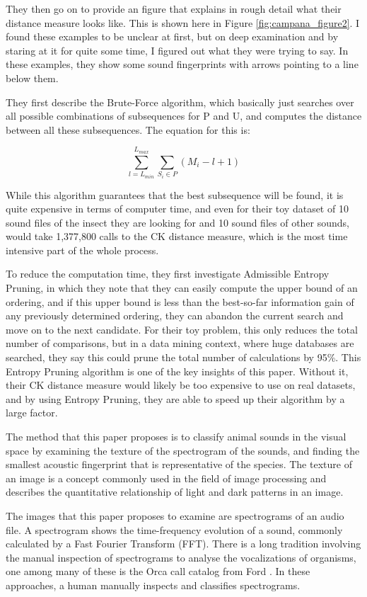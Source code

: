 \documentclass[12pt,oneside]{book}
\begin{document}
They then go on to provide an figure that explains in rough detail
what their distance measure looks like.  This is shown here in Figure
\ref{fig:campana_figure2}.  I found these examples to be unclear at
first, but on deep examination and by staring at it for quite some
time, I figured out what they were trying to say.  In these examples,
they show some sound fingerprints with arrows pointing to a line below
them.

They first describe the Brute-Force algorithm, which basically just
searches over all possible combinations of subsequences for P and U,
and computes the distance between all these subsequences.  The
equation for this is:

\[ \sum^{L_{max}}_{l=L_{min}} \sum_{S_i \in { P }} (M_i - l + 1) \]

While this algorithm guarantees that the best subsequence will be
found, it is quite expensive in terms of computer time, and even for
their toy dataset of 10 sound files of the insect they are looking for
and 10 sound files of other sounds, would take 1,377,800 calls to the
CK distance measure, which is the most time intensive part of the
whole process.

To reduce the computation time, they first investigate Admissible
Entropy Pruning, in which they note that they can easily compute the
upper bound of an ordering, and if this upper bound is less than the
best-so-far information gain of any previously determined ordering,
they can abandon the current search and move on to the next candidate.
For their toy problem, this only reduces the total number of
comparisons, but in a data mining context, where huge databases are
searched, they say this could prune the total number of calculations
by 95\%.  This Entropy Pruning algorithm is one of the key insights of
this paper.  Without it, their CK distance measure would likely be too
expensive to use on real datasets, and by using Entropy Pruning, they
are able to speed up their algorithm by a large factor.

The method that this paper proposes is to classify animal sounds in
the visual space by examining the texture of the spectrogram of the
sounds, and finding the smallest acoustic fingerprint that is
representative of the species.  The texture of an image is a concept
commonly used in the field of image processing and describes the
quantitative relationship of light and dark patterns in an image.

The images that this paper proposes to examine are spectrograms of an
audio file.  A spectrogram shows the time-frequency evolution of a
sound, commonly calculated by a Fast Fourier Transform (FFT).  There
is a long tradition involving the manual inspection of spectrograms to
analyse the vocalizations of organisms, one among many of these is the
Orca call catalog from Ford \cite{ford87}.  In these approaches, a
human manually inspects and classifies spectrograms.
\end{document}
